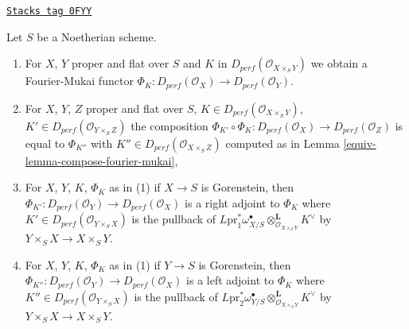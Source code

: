 \begin{lemma}
\label{equiv-lemma-fourier-mukai-flat-proper-over-noetherian}
\href{https://stacks.math.columbia.edu/tag/0FYY}{\texttt{Stacks tag 0FYY}}

Let $S$ be a Noetherian scheme.
\begin{enumerate}
\item For $X$, $Y$ proper and flat over $S$ and $K$ in
$D_{perf}(\mathcal{O}_{X \times_S Y})$ we obtain a Fourier-Mukai functor
$\Phi_K : D_{perf}(\mathcal{O}_X) \to D_{perf}(\mathcal{O}_Y)$.
\item For $X$, $Y$, $Z$ proper and flat over $S$, $K \in
D_{perf}(\mathcal{O}_{X \times_S Y})$, $K' \in
D_{perf}(\mathcal{O}_{Y \times_S Z})$ the composition
$\Phi_{K'} \circ \Phi_K : D_{perf}(\mathcal{O}_X) \to D_{perf}(\mathcal{O}_Z)$
is equal to $\Phi_{K''}$ with $K'' \in D_{perf}(\mathcal{O}_{X \times_S Z})$
computed as in Lemma \ref{equiv-lemma-compose-fourier-mukai},
\item For $X$, $Y$, $K$, $\Phi_K$ as in (1) if $X \to S$ is Gorenstein, then
$\Phi_{K'} : D_{perf}(\mathcal{O}_Y) \to D_{perf}(\mathcal{O}_X)$ is a right
adjoint to $\Phi_K$ where $K' \in D_{perf}(\mathcal{O}_{Y \times_S X})$
is the pullback of $L\text{pr}_1^*\omega_{X/S}^\bullet
\otimes_{\mathcal{O}_{X \times_S Y}}^\mathbf{L} K^\vee$ by
$Y \times_S X \to X \times_S Y$.
\item For $X$, $Y$, $K$, $\Phi_K$ as in (1) if $Y \to S$ is Gorenstein, then
$\Phi_{K''} : D_{perf}(\mathcal{O}_Y) \to D_{perf}(\mathcal{O}_X)$ is a left
adjoint to $\Phi_K$ where $K'' \in D_{perf}(\mathcal{O}_{Y \times_S X})$
is the pullback of $L\text{pr}_2^*\omega_{Y/S}^\bullet
\otimes_{\mathcal{O}_{X \times_S Y}}^\mathbf{L} K^\vee$ by
$Y \times_S X \to X \times_S Y$.
\end{enumerate}
\end{lemma}

